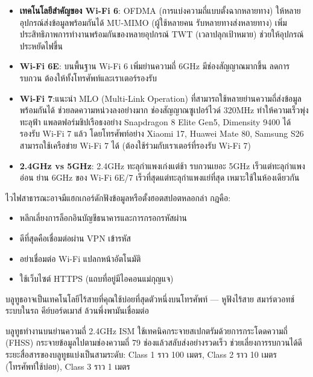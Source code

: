 \begin{itemize}
  \item \textbf{เทคโนโลยีสำคัญของ Wi-Fi 6}: OFDMA (การแบ่งความถี่แบบตั้งฉากหลายทาง) ให้หลายอุปกรณ์ส่งข้อมูลพร้อมกันได้ MU-MIMO (ผู้ใช้หลายคน รับหลายทางส่งหลายทาง) เพิ่มประสิทธิภาพการทำงานพร้อมกันของหลายอุปกรณ์ TWT (เวลาปลุกเป้าหมาย) ช่วยให้อุปกรณ์ประหยัดไฟขึ้น
  \item \textbf{Wi-Fi 6E}: บนพื้นฐาน Wi-Fi 6 เพิ่มย่านความถี่ 6GHz มีช่องสัญญาณมากขึ้น ลดการรบกวน ต้องให้ทั้งโทรศัพท์และเราเตอร์รองรับ
  \item \textbf{Wi-Fi 7}:แนะนำ MLO (Multi-Link Operation) ที่สามารถใช้หลายย่านความถี่ส่งข้อมูลพร้อมกันได้ ช่วยลดความหน่วงลงอย่างมาก ช่องสัญญาณซูเปอร์ไวด์ 320MHz ทำให้ความเร็วพุ่งทะลุฟ้า แพลตฟอร์มชิปเรือธงอย่าง Snapdragon 8 Elite Gen5, Dimensity 9400 ได้รองรับ Wi-Fi 7 แล้ว โดยโทรศัพท์อย่าง Xiaomi 17, Huawei Mate 80, Samsung S26 สามารถใช้เครือข่าย Wi-Fi 7 ได้ (ต้องใช้ร่วมกับเราเตอร์ที่รองรับ Wi-Fi 7)
  \item \textbf{2.4GHz vs 5GHz}: 2.4GHz ทะลุกำแพงเก่งแต่ช้า รบกวนเยอะ 5GHz เร็วแต่ทะลุกำแพงอ่อน ย่าน 6GHz ของ Wi-Fi 6E/7 เร็วที่สุดแต่ทะลุกำแพงแย่ที่สุด เหมาะใช้ในห้องเดียวกัน
\end{itemize}


ไวไฟสาธารณะอาจมีแฮกเกอร์ดักฟังข้อมูลหรือตั้งฮอตสปอตหลอกล่า กฎคือ:

\begin{itemize}
  \item หลีกเลี่ยงการล็อกอินบัญชีธนาคารและการกรอกรหัสผ่าน
  \item ดีที่สุดคือเชื่อมต่อผ่าน VPN เข้ารหัส
  \item อย่าเชื่อมต่อ Wi-Fi แปลกหน้าอัตโนมัติ
  \item ใช้เว็บไซต์ HTTPS (แถบที่อยู่มีไอคอนแม่กุญแจ)
\end{itemize}


บลูทูธอาจเป็นเทคโนโลยีไร้สายที่คุณใช้บ่อยที่สุดตัวหนึ่งบนโทรศัพท์ — หูฟังไร้สาย สมาร์ตวอทช์ ระบบในรถ คีย์บอร์ดเมาส์ ล้วนพึ่งพามันเชื่อมต่อ


บลูทูธทำงานบนย่านความถี่ 2.4GHz ISM ใช้เทคนิคกระจายสเปกตรัมด้วยการกระโดดความถี่ (FHSS) กระจายข้อมูลไปตามช่องความถี่ 79 ช่องแล้วสลับส่งอย่างรวดเร็ว ช่วยเลี่ยงการรบกวนได้ดี ระยะสื่อสารของบลูทูธแบ่งเป็นสามระดับ: Class 1 ราว 100 เมตร, Class 2 ราว 10 เมตร (โทรศัพท์ใช้บ่อย), Class 3 ราว 1 เมตร

